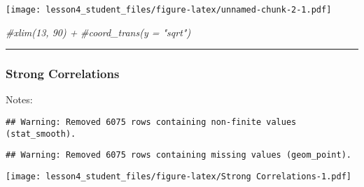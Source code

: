 \documentclass[]{article}
\newenvironment{Shaded}{\begin{snugshade}}{\end{snugshade}}
\newcommand{\KeywordTok}[1]{\textcolor[rgb]{0.13,0.29,0.53}{\textbf{#1}}}
\newcommand{\DataTypeTok}[1]{\textcolor[rgb]{0.13,0.29,0.53}{#1}}
\newcommand{\DecValTok}[1]{\textcolor[rgb]{0.00,0.00,0.81}{#1}}
\newcommand{\FloatTok}[1]{\textcolor[rgb]{0.00,0.00,0.81}{#1}}
\newcommand{\StringTok}[1]{\textcolor[rgb]{0.31,0.60,0.02}{#1}}
\newcommand{\CommentTok}[1]{\textcolor[rgb]{0.56,0.35,0.01}{\textit{#1}}}
\newcommand{\OperatorTok}[1]{\textcolor[rgb]{0.81,0.36,0.00}{\textbf{#1}}}
\newcommand{\NormalTok}[1]{#1}
\begin{document}
\texttt{[image: lesson4\_student\_files/figure-latex/unnamed-chunk-2-1.pdf]}

\begin{Shaded}
\begin{Highlighting}[]
  \CommentTok{#xlim(13, 90) +}
  \CommentTok{#coord_trans(y = "sqrt")}
\end{Highlighting}
\end{Shaded}

\begin{center}\rule{0.5\linewidth}{\linethickness}\end{center}

\subsubsection{Strong Correlations}\label{strong-correlations}

Notes:

\begin{Shaded}
\end{Shaded}

\begin{verbatim}
## Warning: Removed 6075 rows containing non-finite values (stat_smooth).
\end{verbatim}

\begin{verbatim}
## Warning: Removed 6075 rows containing missing values (geom_point).
\end{verbatim}

\texttt{[image: lesson4\_student\_files/figure-latex/Strong Correlations-1.pdf]}
\end{document}
